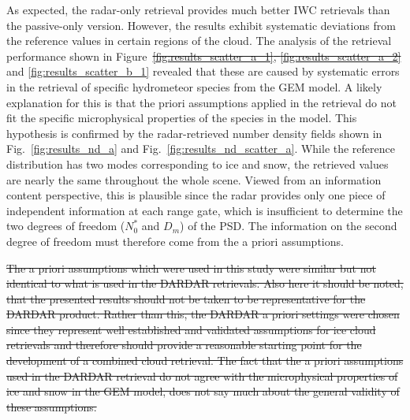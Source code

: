 \documentclass[journal abbreviation, manuscript]{copernicus}
\providecommand{\DIFadd}[1]{{\protect\color{blue}\uwave{#1}}} %
\providecommand{\DIFdel}[1]{{\protect\color{red}\sout{#1}}}                      %
\providecommand{\DIFaddbegin}{} %
\providecommand{\DIFaddend}{} %
\providecommand{\DIFdelbegin}{} %
\providecommand{\DIFdelend}{} %
\begin{document}
As expected, the radar-only retrieval provides much better IWC retrievals than
the passive-only version. However, the results exhibit systematic deviations
from the reference values in certain regions of the cloud. The analysis of the
retrieval performance shown in Figure~\DIFdelbegin \DIFdel{\ref{fig:results_scatter_a_1},
\ref{fig:results_scatter_a_2} }\DIFdelend \DIFaddbegin \DIFadd{\ref{fig:results_scatter_a}
 }\DIFaddend and \ref{fig:results_scatter_b_1} revealed that
these are caused by systematic errors in the retrieval of specific hydrometeor
species from the GEM model. A likely explanation for this is that the \DIFaddbegin \DIFadd{a }\DIFaddend priori
assumptions applied in the retrieval do not fit the specific microphysical
properties of the species in the model. This hypothesis is confirmed by the
radar-retrieved number density fields shown in Fig.~\ref{fig:results_nd_a} and
Fig.~\ref{fig:results_nd_scatter_a}. While the reference distribution has two
modes corresponding to ice and snow, the retrieved values are nearly the same
throughout the whole scene. Viewed from an information content perspective, this
is plausible since the radar provides only one piece of independent information
at each range gate, which is insufficient to determine the two degrees of
freedom ($N_0^*$ and $D_m$) of the PSD. The information on the second degree of
freedom must therefore come from the a priori assumptions.

\DIFdelbegin \DIFdel{The a priori assumptions which were used in this study were similar but not
identical to what is used in the DARDAR retrievals. Also here it should be
noted, that the presented results should not be taken to be representative for
the DARDAR product. Rather than this, the DARDAR a priori settings were chosen
since they represent well established and validated assumptions for ice cloud
retrievals and therefore should provide a reasonable starting point for the
development of a combined cloud retrieval. The fact that the a priori
assumptions used in the DARDAR retrieval do not agree with the microphysical
properties of ice and snow in the GEM model, does not say much about the general
validity of these assumptions.
}%
\end{document}
